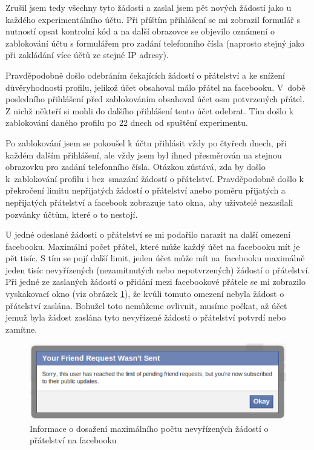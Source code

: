 \documentclass[thesis=M,czech]{FITthesis}[2013/05/10]
\begin{document}
Zrušil jsem tedy všechny tyto žádosti a zaslal jsem pět nových žádostí jako u každého experimentálního účtu. Při příštím přihlášení se mi zobrazil formulář s nutností opsat kontrolní kód a na další obrazovce se objevilo oznámení o zablokování účtu s formulářem pro zadání telefonního čísla (naprosto stejný jako při zakládání více účtů ze stejné IP adresy).

Pravděpodobně došlo odebráním čekajících žádostí o přátelství a ke snížení důvěryhodnosti profilu, jelikož účet obsahoval málo přátel na facebooku. V~době posledního přihlášení před zablokováním obsahoval účet osm potvrzených přátel. Z nichž někteří si mohli do dalšího přihlášení tento účet odebrat. Tím došlo k zablokování daného profilu po 22 dnech od spuštění experimentu. 

Po zablokování jsem se pokoušel k účtu přihlásit vždy po čtyřech dnech, při každém dalším přihlášení, ale vždy jsem byl ihned přesměrován na stejnou obrazovku pro zadání telefonního čísla. Otázkou zůstává, zda by došlo k~zablokování profilu i bez~smazání žádostí o přátelství. Pravděpodobně došlo k překročení limitu nepřijatých žádostí o přátelství anebo poměru přijatých a nepřijatých přátelství a facebook zobrazuje tato okna, aby uživatelé nezasílali pozvánky účtům, které o to nestojí.

U jedné odeslané žádosti o přátelství se mi podařilo narazit na další omezení facebooku. Maximální počet přátel, které může každý účet na facebooku mít je pět tisíc. S tím se pojí další limit, jeden účet může mít na~facebooku maximálně jeden tisíc nevyřízených (nezamítnutých nebo nepotvrzených) žádostí o přátelství. Při jedné ze zaslaných žádostí o přidání mezi facebookové přátele se mi zobrazilo vyskakovací okno (viz obrázek \ref{fig:friendRequestsLimitReached}), že kvůli tomuto omezení nebyla žádost o přátelství zaslána. Bohužel toto nemůžeme ovlivnit, musíme počkat, až účet jemuž byla žádost zaslána tyto nevyřízené žádosti o přátelství potvrdí nebo zamítne.

\begin{figure}[h]
\begin{center}
\includegraphics[width=5in]{figures/friendRequestsLimitReached.png}
\caption{Informace o dosažení maximálního počtu nevyřízených žádostí o přátelství na facebooku}
\label{fig:friendRequestsLimitReached}
\end{center}
\end{figure}
\end{document}
